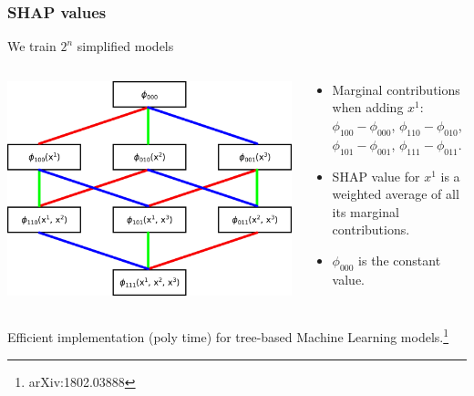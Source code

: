 \documentclass[mathserif, 10pt]{beamer}
\begin{document}
\begin{frame}
    \frametitle{SHAP values}
    We train $2^n$ simplified models

    \begin{columns}
        \begin{column}{0.5\textwidth}
            \includegraphics[width=\columnwidth]{figures/shapgraph.png}
        \end{column}
        \begin{column}{0.5\textwidth}
            \begin{itemize}
                \item Marginal contributions {\color{red} when adding $x^1$}: $\phi_{100}-\phi_{000}$, $\phi_{110}-\phi_{010}$, $\phi_{101}-\phi_{001}$, $\phi_{111} - \phi_{011}$.
                \item SHAP value {\color{red}for $x^1$} is a weighted average of all its marginal contributions.
                \item $\phi_{000}$ is the constant value. 
            \end{itemize}
        \end{column}
    \end{columns}
    
    Efficient implementation (poly time) for tree-based Machine Learning models.\footnote[1]{arXiv:1802.03888}

\end{frame}
\end{document}
